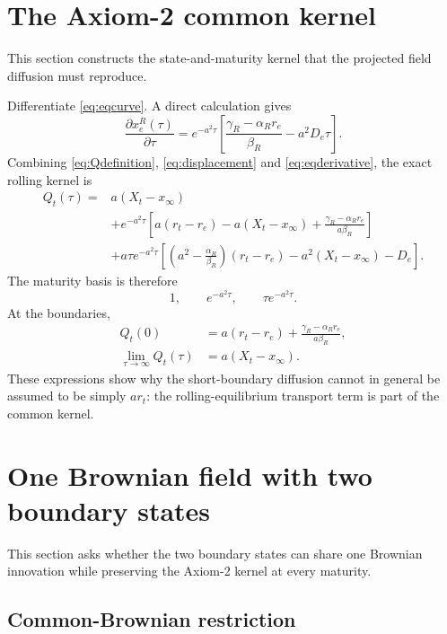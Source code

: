 \documentclass[11pt]{article}
\numberwithin{equation}{section}
\begin{document}
\section{The Axiom-2 common kernel}

This section constructs the state-and-maturity kernel that the projected field diffusion must reproduce.

Differentiate \eqref{eq:eqcurve}. A direct calculation gives
\begin{equation}
 \frac{\partial x_e^R(\tau)}{\partial\tau}
 =e^{-a^2\tau}
 \left[
 \frac{\gamma_R-\alpha_Rr_e}{\beta_R}
 -a^2D_e\tau
 \right].
 \label{eq:eqderivative}
\end{equation}
Combining \eqref{eq:Qdefinition}, \eqref{eq:displacement} and \eqref{eq:eqderivative}, the exact rolling kernel is
\begin{align}
 Q_t(\tau)
 ={}&a(X_t-x_\infty)
 \nonumber\\
 &+e^{-a^2\tau}
 \left[
 a(r_t-r_e)-a(X_t-x_\infty)
 +\frac{\gamma_R-\alpha_Rr_e}{a\beta_R}
 \right]
 \nonumber\\
 &+a\tau e^{-a^2\tau}
 \left[
 \left(a^2-\frac{\alpha_R}{\beta_R}\right)(r_t-r_e)
 -a^2(X_t-x_\infty)-D_e
 \right].
 \label{eq:Qexpanded}
\end{align}
The maturity basis is therefore
\begin{equation}
 1,\qquad e^{-a^2\tau},\qquad \tau e^{-a^2\tau}.
\end{equation}
At the boundaries,
\begin{align}
 Q_t(0)
 &=a(r_t-r_e)+\frac{\gamma_R-\alpha_Rr_e}{a\beta_R},
 \label{eq:Qshort}\\
 \lim_{\tau\to\infty}Q_t(\tau)
 &=a(X_t-x_\infty).
 \label{eq:Qlong}
\end{align}
These expressions show why the short-boundary diffusion cannot in general be assumed to be simply $ar_t$: the rolling-equilibrium transport term is part of the common kernel.

\section{One Brownian field with two boundary states}

This section asks whether the two boundary states can share one Brownian innovation while preserving the Axiom-2 kernel at every maturity.

\subsection{Common-Brownian restriction}
\end{document}
